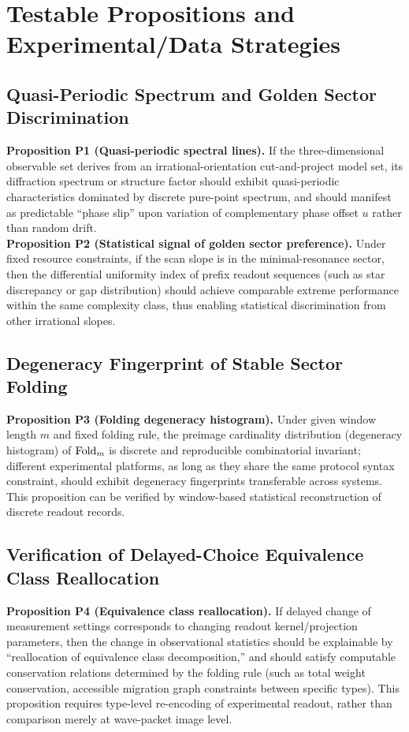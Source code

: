 \section{Testable Propositions and Experimental/Data Strategies}

\subsection{Quasi-Periodic Spectrum and Golden Sector Discrimination}

\textbf{Proposition P1 (Quasi-periodic spectral lines).} If the three-dimensional observable set derives from an irrational-orientation cut-and-project model set, its diffraction spectrum or structure factor should exhibit quasi-periodic characteristics dominated by discrete pure-point spectrum, and should manifest as predictable ``phase slip'' upon variation of complementary phase offset $u$ rather than random drift.\\
\textbf{Proposition P2 (Statistical signal of golden sector preference).} Under fixed resource constraints, if the scan slope is in the minimal-resonance sector, then the differential uniformity index of prefix readout sequences (such as star discrepancy or gap distribution) should achieve comparable extreme performance within the same complexity class, thus enabling statistical discrimination from other irrational slopes.

\subsection{Degeneracy Fingerprint of Stable Sector Folding}

\textbf{Proposition P3 (Folding degeneracy histogram).} Under given window length $m$ and fixed folding rule, the preimage cardinality distribution (degeneracy histogram) of $\mathrm{Fold}_m$ is discrete and reproducible combinatorial invariant; different experimental platforms, as long as they share the same protocol syntax constraint, should exhibit degeneracy fingerprints transferable across systems. This proposition can be verified by window-based statistical reconstruction of discrete readout records.

\subsection{Verification of Delayed-Choice Equivalence Class Reallocation}

\textbf{Proposition P4 (Equivalence class reallocation).} If delayed change of measurement settings corresponds to changing readout kernel/projection parameters, then the change in observational statistics should be explainable by ``reallocation of equivalence class decomposition,'' and should satisfy computable conservation relations determined by the folding rule (such as total weight conservation, accessible migration graph constraints between specific types). This proposition requires type-level re-encoding of experimental readout, rather than comparison merely at wave-packet image level.


